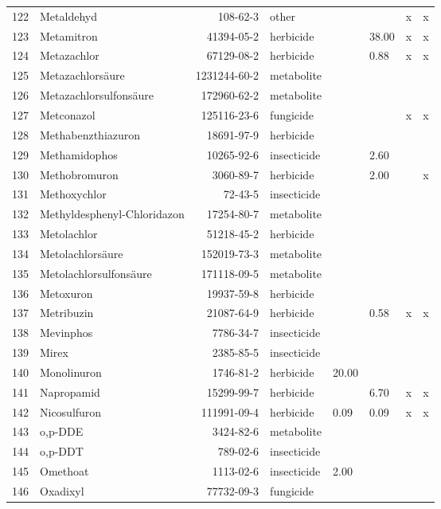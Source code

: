 \begin{longtable}{lp{4cm}rlp{1cm}p{1.5cm}p{1.5cm}p{1cm}}
  122 & Metaldehyd & 108-62-3 & other &  &  & x & x \\ 
  123 & Metamitron & 41394-05-2 & herbicide &  & 38.00 & x & x \\ 
  124 & Metazachlor & 67129-08-2 & herbicide &  & 0.88 & x & x \\ 
  125 & Metazachlorsäure & 1231244-60-2 & metabolite &  &  &  &  \\ 
  126 & Metazachlorsulfonsäure & 172960-62-2 & metabolite &  &  &  &  \\ 
  127 & Metconazol & 125116-23-6 & fungicide &  &  & x & x \\ 
  128 & Methabenzthiazuron & 18691-97-9 & herbicide &  &  &  &  \\ 
  129 & Methamidophos & 10265-92-6 & insecticide &  & 2.60 &  &  \\ 
  130 & Methobromuron & 3060-89-7 & herbicide &  & 2.00 &  & x \\ 
  131 & Methoxychlor & 72-43-5 & insecticide &  &  &  &  \\ 
  132 & Methyldesphenyl-Chloridazon & 17254-80-7 & metabolite &  &  &  &  \\ 
  133 & Metolachlor & 51218-45-2 & herbicide &  &  &  &  \\ 
  134 & Metolachlorsäure & 152019-73-3 & metabolite &  &  &  &  \\ 
  135 & Metolachlorsulfonsäure & 171118-09-5 & metabolite &  &  &  &  \\ 
  136 & Metoxuron & 19937-59-8 & herbicide &  &  &  &  \\ 
  137 & Metribuzin & 21087-64-9 & herbicide &  & 0.58 & x & x \\ 
  138 & Mevinphos & 7786-34-7 & insecticide &  &  &  &  \\ 
  139 & Mirex & 2385-85-5 & insecticide &  &  &  &  \\ 
  140 & Monolinuron & 1746-81-2 & herbicide & 20.00 &  &  &  \\ 
  141 & Napropamid & 15299-99-7 & herbicide &  & 6.70 & x & x \\ 
  142 & Nicosulfuron & 111991-09-4 & herbicide & 0.09 & 0.09 & x & x \\ 
  143 & o,p-DDE & 3424-82-6 & metabolite &  &  &  &  \\ 
  144 & o,p-DDT & 789-02-6 & insecticide &  &  &  &  \\ 
  145 & Omethoat & 1113-02-6 & insecticide & 2.00 &  &  &  \\ 
  146 & Oxadixyl & 77732-09-3 & fungicide &  &  &  &  \\ 

\end{longtable}
